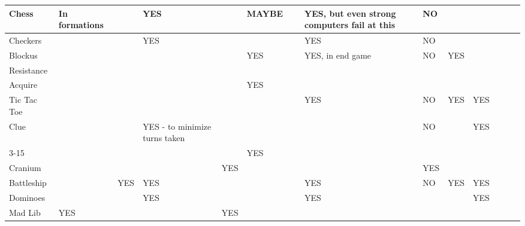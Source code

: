 \documentclass{acm_proc_article-sp}
\begin{document}
\begin{sidewaystable}[htbp]
\begin{tabular}{|p{1.3cm}||p{1cm}|p{2cm}|p{2cm}|p{1.6cm}|p{2cm}|p{1cm}|p{2cm}|p{1cm}|p{1.3cm}|p{2.7cm}|p{1cm}|p{1.6cm}|}
    Chess & In formations & ~ & \cellcolor{blue!25}YES & ~ & MAYBE & ~ & \cellcolor{blue!25}YES, but even strong computers fail at this & \cellcolor{red!25}NO & ~ & ~ & ~ & ~ \\ \hline

    Checkers & ~ & ~ & \cellcolor{blue!25}YES & ~ & ~ & ~ & \cellcolor{blue!25}YES & \cellcolor{red!25}NO & ~ & ~ & ~ & ~ \\ \hline

    Blockus & ~ & ~ & ~ & ~ & \cellcolor{blue!25}YES & ~ & \cellcolor{blue!25}YES, in end game & \cellcolor{red!25}NO & \cellcolor{blue!25}YES & ~ & ~ & ~ \\ \hline

    Resistance & ~ & ~ & ~ & ~ & ~ & ~ & ~ & ~ & ~ & ~ & ~ & ~ \\ \hline

    Acquire & ~ & ~ & ~ & ~ & \cellcolor{blue!25}YES & ~ & ~ & ~ & ~ & ~ & ~ & ~ \\ \hline

    Tic Tac Toe & ~ & ~ & ~ & ~ & ~ & ~ & \cellcolor{blue!25}YES & \cellcolor{red!25}NO & \cellcolor{blue!25}YES & \cellcolor{blue!25}YES & ~ & ~ \\ \hline

    Clue & ~ & ~ & \cellcolor{blue!25}YES - to minimize turns taken & ~ & ~ & ~ & ~ & \cellcolor{red!25}NO & ~ & \cellcolor{blue!25}YES & ~ & ~ \\ \hline

    3-15 & ~ & ~ & ~ & ~ & \cellcolor{blue!25}YES & ~ & ~ & ~ & ~ & ~ & ~ & ~ \\ \hline

    Cranium & ~ & ~ & ~ & \cellcolor{blue!25}YES & ~ & ~ & ~ & \cellcolor{blue!25}YES & ~ & ~ & ~ & ~ \\ \hline

    Battleship & ~ & \cellcolor{blue!25}YES & \cellcolor{blue!25}YES & ~ & ~ & ~ & \cellcolor{blue!25}YES & NO & \cellcolor{blue!25}YES & \cellcolor{blue!25}YES & ~ & ~ \\ \hline

    Dominoes & ~ & ~ & \cellcolor{blue!25}YES & ~ & ~ & ~ & \cellcolor{blue!25}YES & ~ & ~ & \cellcolor{blue!25}YES & ~ & ~ \\ \hline

    Mad Lib & \cellcolor{blue!25}YES & ~ & ~ & \cellcolor{blue!25}YES & ~ & ~ & ~ & ~ & ~ & ~ & ~ & ~ \\ \hline



\end{tabular}
\end{sidewaystable}
\end{document}
